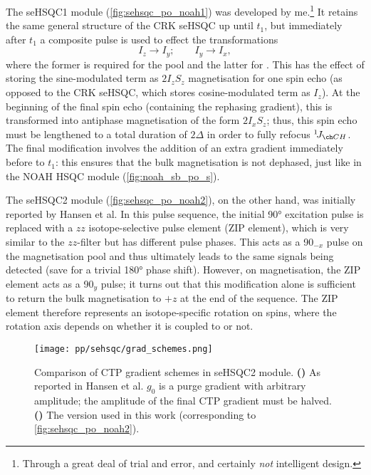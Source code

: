 The seHSQC1 module (\cref{fig:sehsqc_po_noah1}) was developed by me.\footnote{Through a great deal of trial and error, and certainly \textit{not} intelligent design.}
It retains the same general structure of the CRK seHSQC up until $t_1$, but immediately after $t_1$ a composite \proton{} pulse is used to effect the transformations
\begin{equation}
    \label{eq:sehsqc1_dp}
    I_z \to I_y; \qquad I_y \to I_x,
\end{equation}
where the former is required for the  pool and the latter for .
This has the effect of storing the sine-modulated term as $2I_zS_z$ magnetisation for one spin echo (as opposed to the CRK seHSQC, which stores cosine-modulated term as $I_z$).
At the beginning of the final spin echo (containing the rephasing gradient), this is transformed into antiphase magnetisation of the form $2I_xS_z$; thus, this spin echo must be lengthened to a total duration of $2\Delta$ in order to fully refocus $\oneJ{CH}$.
The final modification involves the addition of an extra gradient immediately before to $t_1$: this ensures that the bulk  magnetisation is not dephased, just like in the NOAH HSQC module (\cref{fig:noah_sb_po_s}).

The seHSQC2 module (\cref{fig:sehsqc_po_noah2}), on the other hand, was initially reported by Hansen et al.\autocite{Hansen2021AC}
In this pulse sequence, the initial \proton{} \ang{90} excitation pulse is replaced with a $zz$ isotope-selective pulse element (ZIP element), which is very similar to the $zz$-filter but has different pulse phases.
This acts as a 90\rlap{\unit{\degree}}$_{-x}$ pulse on the  magnetisation pool and thus ultimately leads to the same signals being detected (save for a trivial \ang{180} phase shift).
However, on  magnetisation, the ZIP element acts as a 90\rlap{\unit{\degree}}$_{y}$ pulse; it turns out that this modification alone is sufficient to return the bulk  magnetisation to $+z$ at the end of the sequence.
The ZIP element therefore represents an isotope-specific rotation on \proton{} spins, where the rotation axis depends on whether it is coupled to \carbon{} or not.

\begin{figure}[!ht]
    \centering
    \texttt{[image: pp/sehsqc/grad\_schemes.png]}%
    {\label{fig:sehsqc_grad_schemes_alex}}%
    {\label{fig:sehsqc_grad_schemes_jon}}%
    \caption[Comparison of gradient schemes in seHSQC2 module]{
        Comparison of CTP gradient schemes in seHSQC2 module.
        \textbf{()} As reported in Hansen et al.\autocite{Hansen2021AC} $g_0$ is a purge gradient with arbitrary amplitude; the amplitude of the final CTP gradient must be halved.
        \textbf{()} The version used in this work (corresponding to \cref{fig:sehsqc_po_noah2}).
    }
    \label{fig:sehsqc_grad_schemes}
\end{figure}

